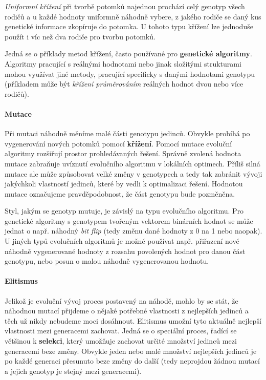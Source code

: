 \emph{Uniformní křížení} při tvorbě potomků najednou prochází celý genotyp
všech rodičů a u každé hodnoty uniformně náhodně vybere, z jakého rodiče se
daný kus genetické informace zkopíruje do potomka. U tohoto typu křížení lze
jednoduše použít i víc než dva rodiče pro tvorbu potomků.

Jedná se o příklady metod křížení, často používané pro \textbf{genetické
algoritmy}. Algoritmy pracující s reálnými hodnotami nebo jinak složitými
strukturami mohou využívat jiné metody, pracující specificky s danými hodnotami
genotypu (příkladem může být \emph{křížení průměrováním} reálných hodnot dvou
nebo více rodičů). 

\paragraph{Mutace}
Při mutaci náhodně měníme malé části genotypu jedinců. Obvykle probíhá po
vygenerování nových potomků pomocí \textbf{křížení}. Pomocí mutace evoluční
algoritmy rozšiřují prostor prohledávaných řešení. Správně zvolená hodnota
mutace zabraňuje uvíznutí evolučního algoritmu v lokálních optimech. Příliš
silná mutace ale může způsobovat velké změny v genotypech a tedy tak zabránit
vývoji jakýchkoli vlastností jedinců, které by vedli k optimalizaci řešení.
Hodnotou mutace označujeme pravděpodobnost, že část genotypu bude pozměněna.

Styl, jakým se genotyp mutuje, je závislý na typu evolučního algoritmu. Pro
genetické algoritmy s genotypem tvořeným vektorem binárních hodnot se může
jednat o např. náhodný \emph{bit flip} (tedy změnu dané hodnoty z 0 na 1 nebo
naopak). U jiných typů evolučních algoritmů je možné používat např. přiřazení
nové náhodně vygenerované hodnoty z rozsahu povolených hodnot pro danou část
genotypu, nebo posun o malou náhodně vygenerovanou hodnotu.

\paragraph{Elitismus}
Jelikož je evoluční vývoj proces postavený na náhodě, mohlo by se stát, že
náhodnou mutací přijdeme o nějaké potřebné vlastnosti z nejlepších jedinců a
těch už nikdy nebudeme moci dosáhnout. Elitismus umožní tyto aktuálně nejlepší
vlastnosti mezi generacemi zachovat. Jedná se o speciální proces, řadící se
většinou k \textbf{selekci}, který umožňuje zachovat určité množství jedinců
mezi generacemi beze změny. Obvykle jeden nebo malé množství nejlepších jedinců
je po každé generaci přesunuto beze změny do další (tedy neprojdou žádnou
mutací a jejich genotyp je stejný mezi generacemi). 


